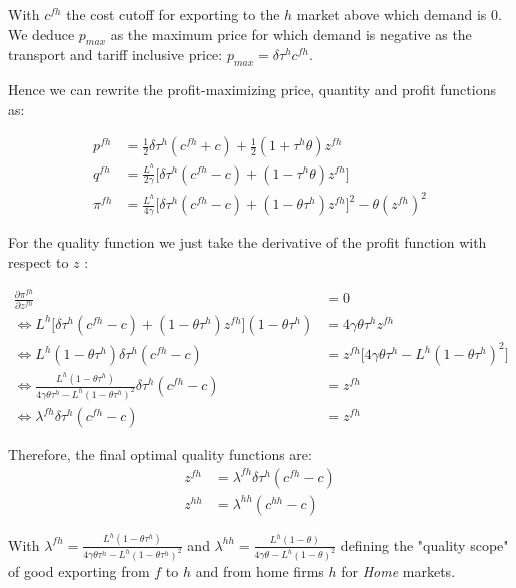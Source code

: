 With $c^{fh}$ the cost cutoff for exporting to the $h$ market above which demand is 0. We deduce $p_{max}$ as the maximum price for which demand is negative as the transport and tariff inclusive price: $p_{max} = \delta \tau^h c^{fh}$.

Hence we can rewrite the profit-maximizing price, quantity and profit functions as:

\begin{align*}
    p^{fh} &= \frac{1}{2}\delta \tau^h ( c^{fh} +  c) + \frac{1}{2} (1 + \tau^h\theta) z^{fh} \\
    q^{fh} &= \frac{L^h}{2\gamma} \big[ \delta \tau^h ( c^{fh} -  c) + (1 - \tau^h\theta) z^{fh}\big] \\
    \pi^{fh} &= \frac{L^h}{4\gamma} \big[\delta \tau^h (c^{fh} - c) + (1 - \theta \tau^h)z^{fh} \big]^2 - \theta (z^{fh})^2    
\end{align*}

For the quality function we just take the derivative of the profit function with respect to $z$ :

\begin{align*}
    \frac{\partial \pi^{fh}}{\partial z^{fh}} &= 0 \\
    \Longleftrightarrow L^h \big[\delta \tau^h (c^{fh} - c) + (1 - \theta \tau^h) z^{fh}\big](1 - \theta \tau^h)& = 4 \gamma \theta \tau^h z^{fh}  \\ 
    \Longleftrightarrow L^h (1 - \theta \tau^h) \delta \tau^h (c^{fh} - c)& = z^{fh} \big[4 \gamma \theta \tau^h - L^h(1 - \theta \tau^h)^2 \big] \\ 
    \Longleftrightarrow \frac{L^h (1 - \theta \tau^h)}{4 \gamma \theta \tau^h - L^h(1 - \theta \tau^h)^2} \delta \tau^h(c^{fh} - c)& = z^{fh}   \\
    \Longleftrightarrow \lambda^{fh}\delta \tau^h(c^{fh} - c)& = z^{fh}
\end{align*}

Therefore, the final optimal quality functions are:
\begin{align*}
    z^{fh} &= \lambda^{fh}\delta \tau^h(c^{fh} - c) \\
    z^{hh} &= \lambda^{hh}(c^{hh} - c)
\end{align*}

With $\lambda^{fh} = \frac{L^h (1 - \theta \tau^h)}{4 \gamma \theta \tau^h - L^h(1 - \theta \tau^h)^2}$ and $\lambda^{hh} = \frac{L^h (1 - \theta)}{4 \gamma \theta - L^h(1 - \theta )^2}$ defining the "quality scope" of good exporting from $f$ to $h$ and from home firms $h$ for \textit{Home} markets. 


